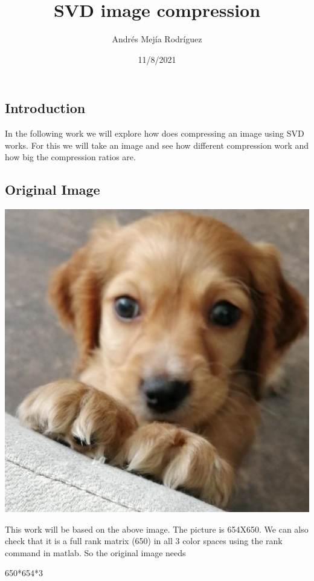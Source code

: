 \documentclass[
]{article}
\title{SVD image compression}
\author{Andrés Mejía Rodríguez}
\date{11/8/2021}
\newenvironment{Shaded}{\begin{snugshade}}{\end{snugshade}}
\newcommand{\DecValTok}[1]{\textcolor[rgb]{0.00,0.00,0.81}{#1}}
\newcommand{\SpecialCharTok}[1]{\textcolor[rgb]{0.00,0.00,0.00}{#1}}
\begin{document}
\maketitle

\hypertarget{introduction}{%
\subsection{Introduction}\label{introduction}}

In the following work we will explore how does compressing an image
using SVD works. For this we will take an image and see how different
compression work and how big the compression ratios are.

\hypertarget{original-image}{%
\subsection{Original Image}\label{original-image}}

\includegraphics{blip2.jpg}

This work will be based on the above image. The picture is 654X650. We
can also check that it is a full rank matrix (650) in all 3 color spaces
using the rank command in matlab. So the original image needs

\begin{Shaded}
\begin{Highlighting}[]
\DecValTok{650}\SpecialCharTok{*}\DecValTok{654}\SpecialCharTok{*}\DecValTok{3}
\end{Highlighting}
\end{Shaded}
\end{document}
